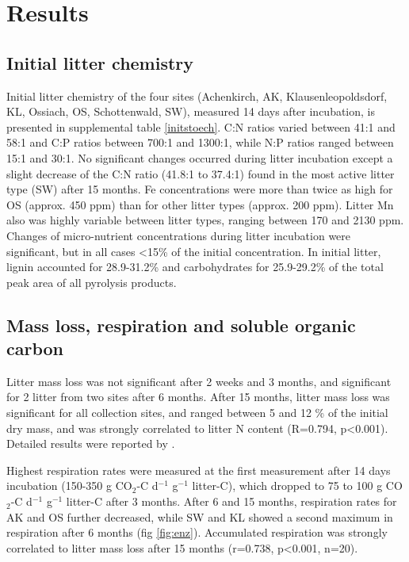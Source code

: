 \section*{Results}
\subsection*{Initial litter chemistry}
Initial litter chemistry of the four sites (Achenkirch, AK, Klausenleopoldsdorf, KL, Ossiach, OS, Schottenwald, SW), measured 14 days after incubation, is presented in supplemental table \ref{initstoech}. C:N ratios varied between 41:1 and 58:1 and C:P ratios between 700:1 and 1300:1, while N:P ratios ranged between 15:1 and 30:1. No significant changes occurred during litter incubation except a slight decrease of the C:N ratio (41.8:1 to 37.4:1) found in the most active litter type (SW) after 15 months. Fe concentrations were more than twice as high for OS (approx. 450 ppm) than for other litter types (approx. 200 ppm). Litter Mn also was highly variable between litter types, ranging between 170 and 2130 ppm. Changes of micro-nutrient concentrations during litter incubation were significant, but in all cases \textless 15\% of the initial concentration. In initial litter, lignin accounted for 28.9-31.2\% and carbohydrates for 25.9-29.2\% of the total peak area of all pyrolysis products.

\subsection*{Mass loss, respiration and soluble organic carbon}

Litter mass loss was not significant after 2 weeks and 3 months, and significant for 2 litter from two sites after 6 months. After 15 months, litter mass loss was significant for all collection sites, and ranged between 5 and 12 \% of the initial dry mass, and was strongly correlated to litter N content (R=0.794, p\textless 0.001). Detailed results were reported by \cite{Mooshammer2011}.

Highest respiration rates were measured at the first measurement after 14 days incubation (150-350 \textmu g CO$_2$-C d$^{-1}$ g$^{-1}$ litter-C), which dropped to 75 to 100 \textmu g CO$_2$-C d$^{-1}$ g$^{-1}$ litter-C after 3 months. After 6 and 15 months, respiration rates for AK and OS further decreased, while SW and KL showed a second maximum in respiration after 6 months (fig \ref{fig:enz}). Accumulated respiration was strongly correlated to litter mass loss after 15 months (r=0.738, p\textless 0.001, n=20).

